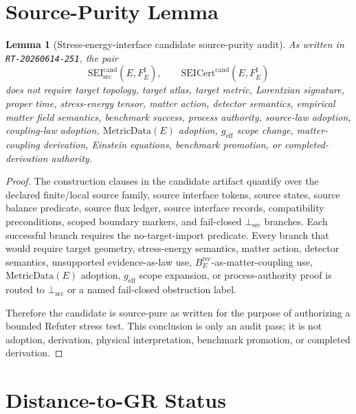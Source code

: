 \documentclass[11pt]{article}
\newcommand{\MetricData}{\mathrm{MetricData}}
\newcommand{\geff}{g_{\mathrm{eff}}}
\newcommand{\SEICand}{\mathrm{SEI}_{\mathrm{src}}^{\mathrm{cand}}}
\newcommand{\SEICertCand}{\mathrm{SEICert}^{\mathrm{cand}}}
\newcommand{\BErec}{B_E^{\mathrm{rec}}}
\newcommand{\BottomSrc}{\bot_{\mathrm{src}}}
\newtheorem{lemma}{Lemma}
\begin{document}
\section{Source-Purity Lemma}

\begin{lemma}[Stress-energy-interface candidate source-purity audit]
As written in \texttt{RT-20260614-251}, the pair
\[
  \SEICand(E,F_E^\sharp),\qquad \SEICertCand(E,F_E^\sharp)
\]
does not require target topology, target atlas, target metric, Lorentzian
signature, proper time, stress-energy tensor, matter action, detector
semantics, empirical matter field semantics, benchmark success, process
authority, source-law adoption, coupling-law adoption, \(\MetricData(E)\)
adoption, \(\geff\) scope change, matter-coupling derivation, Einstein
equations, benchmark promotion, or completed-derivation authority.
\end{lemma}

\begin{proof}
The construction clauses in the candidate artifact quantify over the declared
finite/local source family, source interface tokens, source states, source
balance predicate, source flux ledger, source interface records, compatibility
preconditions, scoped boundary markers, and fail-closed \(\BottomSrc\)
branches. Each successful branch requires the no-target-import predicate.
Every branch that would require target geometry, stress-energy semantics,
matter action, detector semantics, unsupported evidence-as-law use,
\(\BErec\)-as-matter-coupling use, \(\MetricData(E)\) adoption, \(\geff\)
scope expansion, or process-authority proof is routed to \(\BottomSrc\) or a
named fail-closed obstruction label.

Therefore the candidate is source-pure as written for the purpose of
authorizing a bounded Refuter stress test. This conclusion is only an audit
pass; it is not adoption, derivation, physical interpretation, benchmark
promotion, or completed derivation.
\end{proof}

\section{Distance-to-GR Status}
\end{document}
